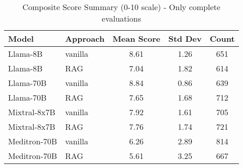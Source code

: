 \begin{table}[h]
\centering
\begin{tabular}{llccc}
\toprule
Model & Approach & Mean Score & Std Dev & Count \\
\midrule

Llama-8B & vanilla & 8.61 & 1.26 & 651 \\
Llama-8B & RAG & 7.04 & 1.82 & 614 \\

Llama-70B & vanilla & 8.84 & 0.86 & 639 \\
Llama-70B & RAG & 7.65 & 1.68 & 712 \\

Mixtral-8x7B & vanilla & 7.92 & 1.61 & 705 \\
Mixtral-8x7B & RAG & 7.76 & 1.74 & 721 \\

Meditron-70B & vanilla & 6.26 & 2.89 & 814 \\
Meditron-70B & RAG & 5.61 & 3.25 & 667 \\


\bottomrule
\end{tabular}
\caption{Composite Score Summary (0-10 scale) - Only complete evaluations}
\label{tab:scores_complete}
\end{table}